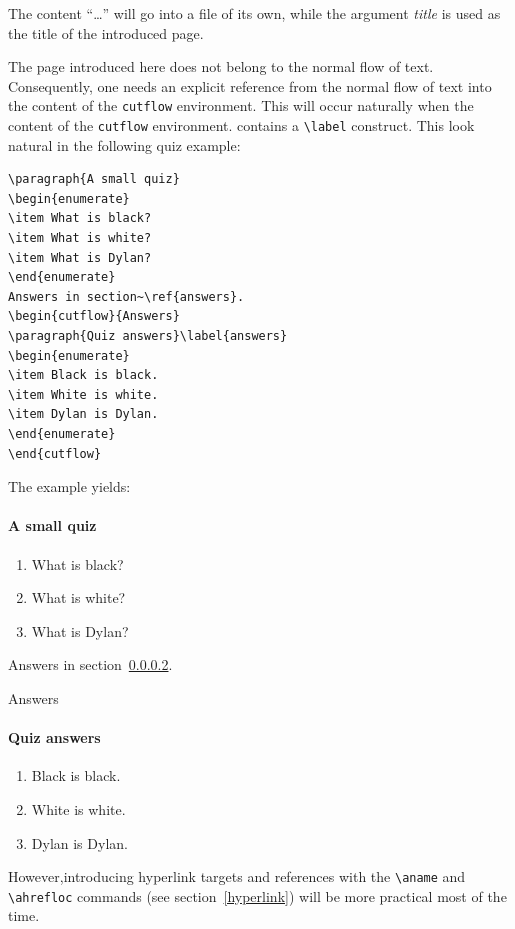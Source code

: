 \noindent The content ``\ldots'' will go into a file of its
own, while
the argument \textit{title} is used as the title of the introduced
\html{} page.

The \html{} page introduced here does not belong to the normal flow of
text.
Consequently, one needs an explicit reference from the normal flow of text
into the content of the \verb+cutflow+ environment.
This will occur naturally when the content of the \verb+cutflow+ environment.
contains a \verb+\label+ construct.
This look natural in the following quiz example:
\begin{verbatim}
\paragraph{A small quiz}
\begin{enumerate}
\item What is black?
\item What is white?
\item What is Dylan?
\end{enumerate}
Answers in section~\ref{answers}.
\begin{cutflow}{Answers}
\paragraph{Quiz answers}\label{answers}
\begin{enumerate}
\item Black is black.
\item White is white.
\item Dylan is Dylan.
\end{enumerate}
\end{cutflow}
\end{verbatim}
\ifhevea The example yields:
\paragraph{A small quiz}
\begin{enumerate}
\item What is black?
\item What is white?
\item What is Dylan?
\end{enumerate}
Answers in section~\ref{answers}.
\begin{cutflow}{Answers}
\paragraph{Quiz answers}\label{answers}
\begin{enumerate}
\item Black is black.
\item White is white.
\item Dylan is Dylan.
\end{enumerate}
\end{cutflow}
\fi
{}
However,introducing \html{} hyperlink targets and
references with the \verb+\aname+ and \verb+\ahrefloc+ commands
(see section~\ref{hyperlink})
will be more practical most of the time.

